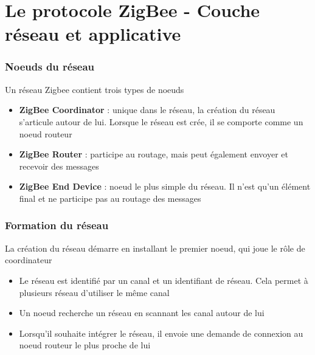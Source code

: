 \documentclass{beamer}
\begin{document}
  \section{Le protocole ZigBee - Couche réseau et applicative}

  \begin{frame}
   \frametitle{Noeuds du réseau}
   \begin{block}{Un réseau Zigbee contient trois types de noeuds}
      \begin{itemize}
	\item \textbf{ZigBee Coordinator} : unique dans le réseau, la création du réseau s'articule autour de lui. Lorsque le réseau est crée, il se comporte comme un noeud routeur
	\item \textbf{ZigBee Router} : participe au routage, mais peut également envoyer et recevoir des messages
	\item \textbf{ZigBee End Device} : noeud le plus simple du réseau. Il n'est qu'un élément final et ne participe pas au routage des messages
      \end{itemize}
    \end{block}	
  \end{frame}
  
  \begin{frame}
   \frametitle{Formation du réseau}
   \begin{block}{La création du réseau démarre en installant le premier noeud, qui joue le rôle de coordinateur}
    \begin{itemize}
     \item Le réseau est identifié par un canal et un identifiant de réseau. Cela permet à plusieurs réseau d'utiliser le même canal
     \item Un noeud recherche un réseau en scannant les canal autour de lui
     \item Lorsqu'il souhaite intégrer le réseau, il envoie une demande de connexion au noeud routeur le plus proche de lui 
    \end{itemize}
   \end{block}
  \end{frame}
\end{document}
